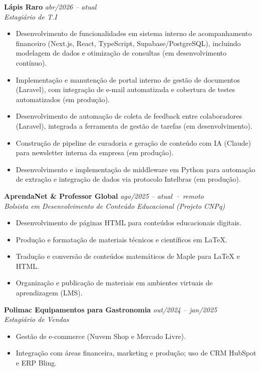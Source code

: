 \documentclass[11pt,a4paper]{article}
\begin{document}
\textbf{Lápis Raro} \hfill \textit{abr/2026 -- atual}\\
\textit{Estagiário de T.I}
\begin{itemize}
  \item Desenvolvimento de funcionalidades em sistema interno de acompanhamento financeiro
        (Next.js, React, TypeScript, Supabase/PostgreSQL), incluindo modelagem de dados e
        otimização de consultas (em desenvolvimento contínuo).
  \item Implementação e manutenção de portal interno de gestão de documentos (Laravel), com
        integração de e-mail automatizada e cobertura de testes automatizados (em produção).
  \item Desenvolvimento de automação de coleta de feedback entre colaboradores (Laravel),
        integrada a ferramenta de gestão de tarefas (em desenvolvimento).
  \item Construção de pipeline de curadoria e geração de conteúdo com IA (Claude) para
        newsletter interna da empresa (em produção).
  \item Desenvolvimento e implementação de middleware em Python para automação de extração e
        integração de dados via protocolo Intelbras (em produção).
\end{itemize}

\medskip

\textbf{AprendaNet \& Professor Global} \hfill \textit{ago/2025 -- atual · remoto}\\
\textit{Bolsista em Desenvolvimento de Conteúdo Educacional (Projeto CNPq)}
\begin{itemize}
  \item Desenvolvimento de páginas HTML para conteúdos educacionais digitais.
  \item Produção e formatação de materiais técnicos e científicos em \LaTeX.
  \item Tradução e conversão de conteúdos matemáticos de Maple para \LaTeX{} e HTML.
  \item Organização e publicação de materiais em ambientes virtuais de aprendizagem (LMS).
\end{itemize}

\medskip

\textbf{Polimac Equipamentos para Gastronomia} \hfill \textit{out/2024 -- jan/2025}\\
\textit{Estagiário de Vendas}
\begin{itemize}
  \item Gestão de e-commerce (Nuvem Shop e Mercado Livre).
  \item Integração com áreas financeira, marketing e produção; uso de CRM HubSpot e ERP Bling.
\end{itemize}
\end{document}
